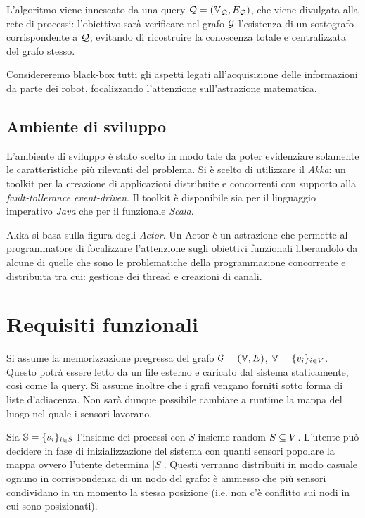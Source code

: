 \documentclass{llncs}
\begin{document}
L'algoritmo viene innescato da una query $\mathcal{Q} = (\mathbb{V}_{\mathcal{Q}}, E_{\mathcal{Q}})$, 
che viene divulgata alla rete di processi: l'obiettivo sarà verificare
nel grafo $\mathcal{G}$ l'esistenza di un sottografo corrispondente a $\mathcal{Q}$,
evitando di ricostruire la conoscenza totale e centralizzata del
grafo stesso.

Considereremo black-box tutti gli aspetti legati all'acquisizione delle informazioni 
da parte dei robot, focalizzando l'attenzione sull'astrazione matematica.



\subsection{Ambiente di sviluppo}
L'ambiente di sviluppo è stato scelto in modo tale da poter evidenziare solamente
le caratteristiche più rilevanti del problema. 
Si è scelto di utilizzare il \emph{Akka}: un toolkit per la creazione di applicazioni 
distribuite e concorrenti con supporto alla \emph{fault-tollerance event-driven}.
Il toolkit è disponibile sia per il linguaggio imperativo \emph{Java} che per il 
funzionale \emph{Scala}.

Akka si basa sulla figura degli \emph{Actor}. Un Actor è un astrazione che permette
al programmatore di focalizzare l'attenzione sugli obiettivi funzionali liberandolo 
da alcune di quelle che sono le  problematiche della programmazione 
concorrente e distribuita tra cui: gestione dei thread e creazioni di canali.

\section{Requisiti funzionali}
\label{sec:func-req}


Si assume la memorizzazione pregressa del grafo $\mathcal{G} = ( \mathbb{V}, E)$, $\mathbb{V} = \{v_i\}_{i \in V}$.
Questo potrà essere letto da un file esterno e caricato dal sistema
staticamente, così come la query. Si assume inoltre che i grafi vengano forniti
sotto forma di liste d'adiacenza.
Non sarà dunque possibile cambiare a runtime la mappa
del luogo nel quale i sensori lavorano.


Sia $\mathbb{S} = \{s_i \}_{i \in S}$ l'insieme dei processi con $S$ insieme random $S \subseteq V$.
L'utente può decidere in fase di inizializzazione del sistema con quanti
sensori popolare la mappa ovvero l'utente determina $|S|$.
 Questi verranno distribuiti in modo casuale
ognuno in corrispondenza di un nodo del grafo: è ammesso che più
sensori condividano in un momento la stessa posizione
(i.e. non c'è conflitto sui nodi in cui sono posizionati). 
\end{document}
